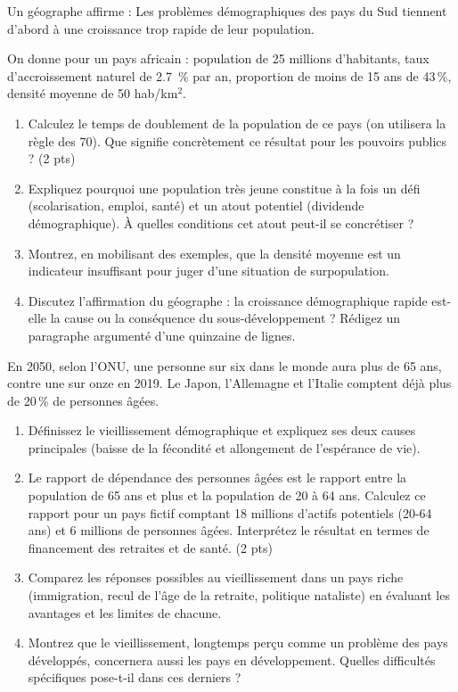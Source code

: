 \documentclass[11pt]{article}
\begin{document}
\begin{exercice}
Un géographe affirme : \og Les problèmes démographiques des pays du Sud tiennent d'abord à une croissance trop rapide de leur population. \fg

On donne pour un pays africain : population de 25 millions d'habitants, taux d'accroissement naturel de \SI{2,7}{\%} par an, proportion de moins de 15 ans de 43\,\%, densité moyenne de 50 hab/km$^2$.

\begin{enumerate}
\item Calculez le temps de doublement de la population de ce pays (on utilisera la règle des 70). Que signifie concrètement ce résultat pour les pouvoirs publics ? (2 pts)
\item Expliquez pourquoi une population très jeune constitue à la fois un défi (scolarisation, emploi, santé) et un atout potentiel (dividende démographique). À quelles conditions cet atout peut-il se concrétiser ?
\item Montrez, en mobilisant des exemples, que la densité moyenne est un indicateur insuffisant pour juger d'une situation de surpopulation.
\item Discutez l'affirmation du géographe : la croissance démographique rapide est-elle la cause ou la conséquence du sous-développement ? Rédigez un paragraphe argumenté d'une quinzaine de lignes.
\end{enumerate}
\end{exercice}

\begin{exercice}
En 2050, selon l'ONU, une personne sur six dans le monde aura plus de 65 ans, contre une sur onze en 2019. Le Japon, l'Allemagne et l'Italie comptent déjà plus de 20\,\% de personnes âgées.

\begin{enumerate}
\item Définissez le vieillissement démographique et expliquez ses deux causes principales (baisse de la fécondité et allongement de l'espérance de vie).
\item Le rapport de dépendance des personnes âgées est le rapport entre la population de 65 ans et plus et la population de 20 à 64 ans. Calculez ce rapport pour un pays fictif comptant 18 millions d'actifs potentiels (20-64 ans) et 6 millions de personnes âgées. Interprétez le résultat en termes de financement des retraites et de santé. (2 pts)
\item Comparez les réponses possibles au vieillissement dans un pays riche (immigration, recul de l'âge de la retraite, politique nataliste) en évaluant les avantages et les limites de chacune.
\item Montrez que le vieillissement, longtemps perçu comme un problème des pays développés, concernera aussi les pays en développement. Quelles difficultés spécifiques pose-t-il dans ces derniers ?
\end{enumerate}
\end{exercice}
\end{document}
